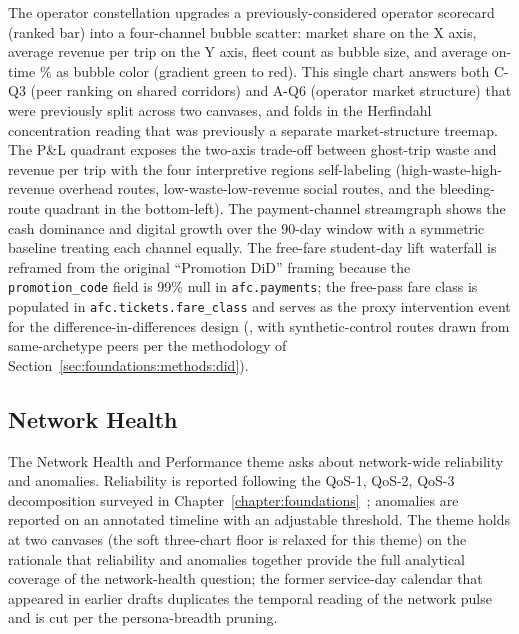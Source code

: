 The operator constellation upgrades a previously-considered operator
scorecard (ranked bar) into a four-channel bubble scatter: market
share on the X axis, average revenue per trip on the Y axis, fleet
count as bubble size, and average on-time \% as bubble color
(gradient green to red). This single chart answers both C-Q3 (peer
ranking on shared corridors) and A-Q6 (operator market structure)
that were previously split across two canvases, and folds in the
Herfindahl concentration reading that was previously a separate
market-structure treemap. The P\&L quadrant exposes the two-axis
trade-off between ghost-trip waste and revenue per trip with the four
interpretive regions self-labeling (high-waste-high-revenue overhead
routes, low-waste-low-revenue social routes, and the bleeding-route
quadrant in the bottom-left). The payment-channel streamgraph shows
the cash dominance and digital growth over the 90-day window with a
symmetric baseline treating each channel equally. The free-fare
student-day lift waterfall is reframed from the original
``Promotion DiD'' framing because the \texttt{promotion\_code} field
is 99\% null in \texttt{afc.payments}; the free-pass fare class is
populated in \texttt{afc.tickets.fare\_class} and serves as the
proxy intervention event for the difference-in-differences design
(\cite{abadie2005did}, with synthetic-control routes drawn from same-archetype
peers per the methodology of Section~\ref{sec:foundations:methods:did}).

\subsection*{Network Health}
\label{sec:solution:viz:network}

The Network Health and Performance theme asks about network-wide
reliability and anomalies. Reliability is reported following the
QoS-1, QoS-2, QoS-3 decomposition surveyed in
Chapter~\ref{chapter:foundations}~\cite{srisakaokul2023}; anomalies
are reported on an annotated timeline with an adjustable threshold.
The theme holds at two canvases (the soft three-chart floor is
relaxed for this theme) on the rationale that reliability and
anomalies together provide the full analytical coverage of the
network-health question; the former service-day calendar that
appeared in earlier drafts duplicates the temporal reading of the
network pulse and is cut per the persona-breadth pruning.

